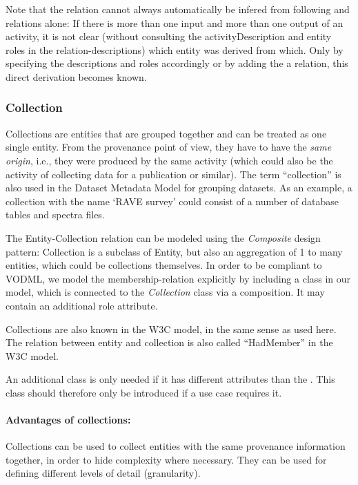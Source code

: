Note that the  relation
cannot always automatically be infered from following  and  relations alone:
If there is more than one input and more than one output of an activity, it is not clear (without 
consulting the activityDescription and entity roles in the relation-descriptions) which entity was derived from which.
Only by specifying the descriptions and roles accordingly or by adding the a  relation,
this direct derivation becomes known.



\subsubsection{Collection}\label{sec:collection}
Collections are entities that are grouped together and can be treated as one single entity. 
From the provenance point of view, they have to have the \emph{same origin}, i.e., they were 
produced by the same activity (which could also be the activity of collecting
data for a publication or similar). The term ``collection'' is 
also used in the Dataset Metadata Model for grouping datasets.
As an example, a collection 
with the name `RAVE survey' could consist of a number of database tables and spectra files.


The Entity-Collection relation can be modeled using the \emph{Composite} design pattern: 
Collection is a subclass of Entity, but also an aggregation of 1 to many entities, 
which could be collections themselves. 
In order to be compliant to VODML, we model the membership-relation explicitly 
by including a  class in our model, which is connected to the
\emph{Collection} class via a composition. It may contain an additional role attribute.

Collections are also known in the W3C model, in the same sense as used here.
The relation between entity and collection is also called ``HadMember'' in the W3C model.

An additional class  is only 
needed if it has different attributes than 
the . This class should therefore only be introduced if a use case requires it.

\paragraph{Advantages of collections:} Collections can be used to collect entities with the same provenance information together, 
    in order to hide complexity where necessary. They can be used for defining 
    different levels of detail (granularity).

